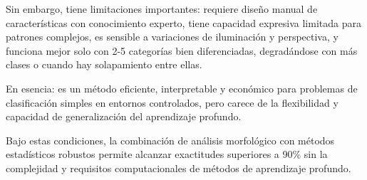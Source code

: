 Sin embargo, tiene limitaciones importantes: requiere diseño manual de características con conocimiento experto, tiene capacidad expresiva limitada para patrones complejos, es sensible a variaciones de iluminación y perspectiva, y funciona mejor solo con 2-5 categorías bien diferenciadas, degradándose con más clases o cuando hay solapamiento entre ellas.

En esencia: es un método eficiente, interpretable y económico para problemas de clasificación simples en entornos controlados, pero carece de la flexibilidad y capacidad de generalización del aprendizaje profundo.

Bajo estas condiciones, la combinación de análisis morfológico con métodos estadísticos robustos permite alcanzar exactitudes superiores a 90\% sin la complejidad y requisitos computacionales de métodos de aprendizaje profundo.
